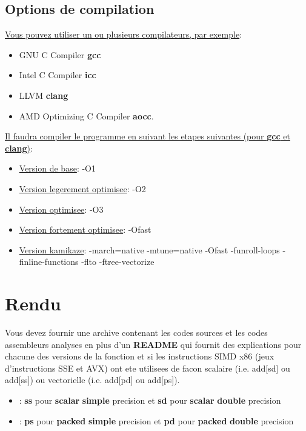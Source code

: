 \documentclass[11pt]{article}
\begin{document}
\subsection{Options de compilation}
\label{sec:orgae66d41}

\uline{Vous pouvez utiliser un ou plusieurs compilateurs, par exemple}: 

\begin{itemize}
\item GNU C Compiler \textbf{gcc}
\item Intel C Compiler \textbf{icc}
\item LLVM \textbf{clang}
\item AMD Optimizing C Compiler \textbf{aocc}.
\end{itemize}

\uline{Il faudra compiler le programme en suivant les etapes suivantes (pour \textbf{gcc} et \textbf{clang})}:

\begin{itemize}
\item \uline{Version de base}: -O1
\item \uline{Version legerement optimisee}: -O2
\item \uline{Version optimisee}: -O3
\item \uline{Version fortement optimisee}: -Ofast
\item \uline{Version kamikaze}: -march=native -mtune=native -Ofast -funroll-loops -finline-functions -flto -ftree-vectorize
\end{itemize}

\section{Rendu}
\label{sec:org60c2437}

Vous devez fournir une archive contenant les codes sources et les codes assembleurs analyses en plus d'un \textbf{README} qui fournit
des explications pour chacune des versions de la fonction et si les instructions SIMD x86 (jeux d'instructions SSE et AVX) ont ete 
utilisees de facon scalaire (i.e. add[sd] ou add[ss]) ou vectorielle (i.e. add[pd] ou add[ps]).

\begin{itemize}
\item\relax [ss | sd]: \textbf{ss} pour \textbf{scalar} \textbf{simple} precision et \textbf{sd} pour \textbf{scalar} \textbf{double} precision
\item\relax [ps | pd]: \textbf{ps} pour \textbf{packed} \textbf{simple} precision et \textbf{pd} pour \textbf{packed} \textbf{double} precision
\end{itemize}
\end{document}
